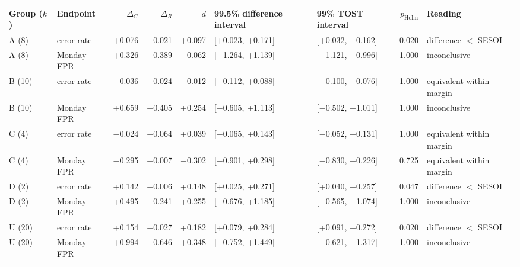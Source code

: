 \begin{tabular}{@{}llrrrllrl@{}}
\toprule
Group ($k$) & Endpoint & $\bar\Delta_G$ & $\bar\Delta_R$ & $\bar d$ & 99.5\% difference interval & 99\% TOST interval & $p_{\mathrm{Holm}}$ & Reading \\
\midrule
A (8) & error rate & +0.076 & $-$0.021 & +0.097 & [+0.023, +0.171] & [+0.032, +0.162] & 0.020 & difference $<$ SESOI \\
A (8) & Monday FPR & +0.326 & +0.389 & $-$0.062 & [$-$1.264, +1.139] & [$-$1.121, +0.996] & 1.000 & inconclusive \\
B (10) & error rate & $-$0.036 & $-$0.024 & $-$0.012 & [$-$0.112, +0.088] & [$-$0.100, +0.076] & 1.000 & equivalent within margin \\
B (10) & Monday FPR & +0.659 & +0.405 & +0.254 & [$-$0.605, +1.113] & [$-$0.502, +1.011] & 1.000 & inconclusive \\
C (4) & error rate & $-$0.024 & $-$0.064 & +0.039 & [$-$0.065, +0.143] & [$-$0.052, +0.131] & 1.000 & equivalent within margin \\
C (4) & Monday FPR & $-$0.295 & +0.007 & $-$0.302 & [$-$0.901, +0.298] & [$-$0.830, +0.226] & 0.725 & equivalent within margin \\
D (2) & error rate & +0.142 & $-$0.006 & +0.148 & [+0.025, +0.271] & [+0.040, +0.257] & 0.047 & difference $<$ SESOI \\
D (2) & Monday FPR & +0.495 & +0.241 & +0.255 & [$-$0.676, +1.185] & [$-$0.565, +1.074] & 1.000 & inconclusive \\
U (20) & error rate & +0.154 & $-$0.027 & +0.182 & [+0.079, +0.284] & [+0.091, +0.272] & 0.020 & difference $<$ SESOI \\
U (20) & Monday FPR & +0.994 & +0.646 & +0.348 & [$-$0.752, +1.449] & [$-$0.621, +1.317] & 1.000 & inconclusive \\
\bottomrule
\end{tabular}
